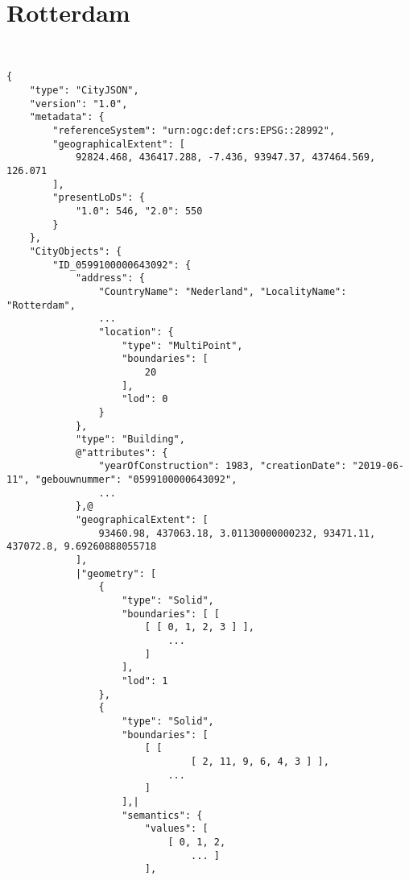 \section{Rotterdam}

\begin{scriptsize}
\begin{minipage}[c]{\linewidth / 1}


\begin{lstlisting}[frame=single,style=base,caption={Snippet of Rotterdam dataset}, label=dataset:rotterdam]


{
    "type": "CityJSON",
    "version": "1.0",
    "metadata": {
        "referenceSystem": "urn:ogc:def:crs:EPSG::28992",
        "geographicalExtent": [
            92824.468, 436417.288, -7.436, 93947.37, 437464.569, 126.071
        ],
        "presentLoDs": {
            "1.0": 546, "2.0": 550
        }
    },
    "CityObjects": {
        "ID_0599100000643092": {
            "address": {
                "CountryName": "Nederland", "LocalityName": "Rotterdam",
                ...
                "location": {
                    "type": "MultiPoint",
                    "boundaries": [
                        20
                    ],
                    "lod": 0
                }
            },
            "type": "Building",
            @"attributes": {
                "yearOfConstruction": 1983, "creationDate": "2019-06-11", "gebouwnummer": "0599100000643092",
                ...
            },@
            "geographicalExtent": [
                93460.98, 437063.18, 3.01130000000232, 93471.11, 437072.8, 9.69260888055718
            ],
            |"geometry": [
                {
                    "type": "Solid",
                    "boundaries": [ [
                        [ [ 0, 1, 2, 3 ] ],
                            ...
                        ]
                    ],
                    "lod": 1
                },
                {
                    "type": "Solid",
                    "boundaries": [
                        [ [
                                [ 2, 11, 9, 6, 4, 3 ] ],
                            ...
                        ]
                    ],|
                    "semantics": {
                        "values": [
                            [ 0, 1, 2,
                                ... ]
                        ],

\end{lstlisting}
\end{minipage}
\end{scriptsize}
